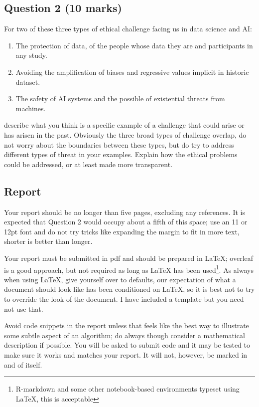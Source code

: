 \documentclass[12pt]{article}
\begin{document}
\subsection*{Question 2 (10 marks)}

For two of these three types of ethical challenge facing us in data science and AI:
\begin{enumerate}
\item The protection of data, of the people whose data they are and participants in any study.
\item Avoiding the amplification of biases and regressive values implicit in historic dataset.
\item The safety of AI systems and the possible of existential threats from machines.
\end{enumerate}
describe what you think is a specific example of a challenge that
could arise or has arisen in the past. Obviously the three broad types
of challenge overlap, do not worry about the boundaries between these
types, but do try to address different types of threat in your
examples. Explain how the ethical problems could be addressed, or at
least made more transparent.

\subsection*{Report}

Your report should be no longer than five pages, excluding any
references. It is expected that Question 2 would occupy about a fifth
of this space; use an 11 or 12pt font and do not try tricks like
expanding the margin to fit in more text, shorter is better than
longer.

Your report must be submitted in pdf and should be prepared in LaTeX;
overleaf is a good approach, but not required as long as LaTeX has
been used\footnote{R-markdown and some other notebook-based environments typeset using LaTeX, this is acceptable}. As always when using LaTeX, give yourself over to defaults,
our expectation of what a document should look like has been
conditioned on LaTeX, so it is best not to try to override the look of
the document. I have included a template but you need not use that.

Avoid code snippets in the report unless that feels like the best way
to illustrate some subtle aspect of an algorithm; do always though
consider a mathematical description if possible. You will be asked to
submit code and it may be tested to make sure it works and matches
your report. It will not, however, be marked in and of itself.
\end{document}

